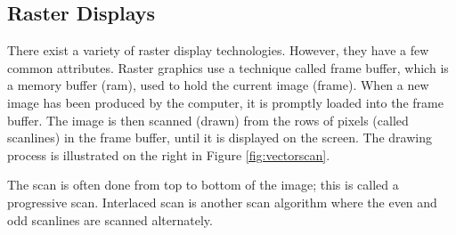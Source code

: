 \subsection{Raster Displays}
There exist a variety of raster display technologies.
However, they have a few common attributes.
Raster graphics use a technique called frame buffer, which is a memory buffer (\gls{ram}), used to hold the current image (frame).
When a new image has been produced by the computer, it is promptly loaded into the frame buffer.
The image is then scanned (drawn) from the rows of pixels (called scanlines) in the frame buffer, until it is displayed on the screen.
The drawing process is illustrated on the right in Figure \ref{fig:vectorscan}.

The scan is often done from top to bottom of the image; this is called a progressive scan.
Interlaced scan is another scan algorithm where the even and odd scanlines are scanned alternately.
